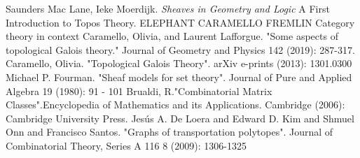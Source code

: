 \documentclass[a4paper]{amsproc}
\theoremstyle{plain}
\theoremstyle{definition}
\theoremstyle{remark}
\numberwithin{equation}{section}
\begin{document}
\begin{thebibliography}{9}
Saunders Mac Lane, Ieke Moerdijk. \textit{Sheaves in Geometry and Logic} A First Introduction to Topos Theory.
ELEPHANT
CARAMELLO
FREMLIN
Category theory in context
Caramello, Olivia, and Laurent Lafforgue. "Some aspects of topological Galois theory." Journal of Geometry and Physics 142 (2019): 287-317.
 Caramello, Olivia. "Topological Galois Theory". arXiv e-prints (2013):  1301.0300
Michael P. Fourman. "Sheaf models for set theory". Journal of Pure and Applied Algebra 19 (1980): 91 - 101
Brualdi, R."Combinatorial Matrix Classes".Encyclopedia of Mathematics and its Applications. Cambridge  (2006): Cambridge University Press.
 Jesús A. De Loera and Edward D. Kim and Shmuel Onn and Francisco Santos. "Graphs of transportation polytopes". Journal of Combinatorial Theory, Series A 116 8 (2009): 1306-1325
\end{thebibliography}
\end{document}
